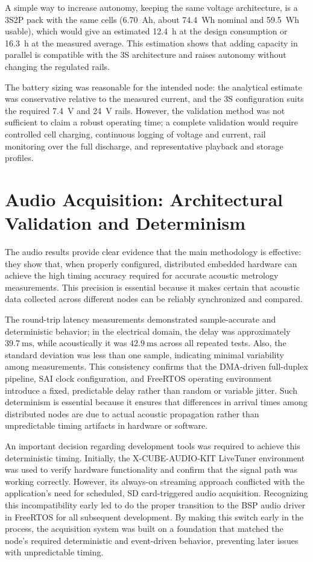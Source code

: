 A simple way to increase autonomy, keeping the same voltage architecture, is a 3S2P pack with the same cells (6.70~Ah, about 74.4~Wh nominal and 59.5~Wh usable), which would give an estimated 12.4~h at the design consumption or 16.3~h at the measured average. This estimation shows that adding capacity in parallel is compatible with the 3S architecture and raises autonomy without changing the regulated rails.

The battery sizing was reasonable for the intended node: the analytical estimate was conservative relative to the measured current, and the 3S configuration suits the required 7.4~V and 24~V rails. However, the validation method was not sufficient to claim a robust operating time; a complete validation would require controlled cell charging, continuous logging of voltage and current, rail monitoring over the full discharge, and representative playback and storage profiles.

\section{Audio Acquisition: Architectural Validation and Determinism}

The audio results provide clear evidence that the main methodology is effective: they show that, when properly configured, distributed embedded hardware can achieve the high timing accuracy required for accurate acoustic metrology measurements. This precision is essential because it makes certain that acoustic data collected across different nodes can be reliably synchronized and compared.

The round-trip latency measurements demonstrated sample-accurate and deterministic behavior; in the electrical domain, the delay was approximately $\SI{39.7}{\ms}$, while acoustically it was $\SI{42.9}{\ms}$ across all repeated tests. Also, the standard deviation was less than one sample, indicating minimal variability among measurements. This consistency confirms that the DMA-driven full-duplex pipeline, SAI clock configuration, and FreeRTOS operating environment introduce a fixed, predictable delay rather than random or variable jitter. Such determinism is essential because it ensures that differences in arrival times among distributed nodes are due to actual acoustic propagation rather than unpredictable timing artifacts in hardware or software.

An important decision regarding development tools was required to achieve this deterministic timing. Initially, the X-CUBE-AUDIO-KIT LiveTuner environment was used to verify hardware functionality and confirm that the signal path was working correctly. However, its always-on streaming approach conflicted with the application’s need for scheduled, SD card-triggered audio acquisition. Recognizing this incompatibility early led to do the proper transition to the BSP audio driver in FreeRTOS for all subsequent development. By making this switch early in the process, the acquisition system was built on a foundation that matched the node’s required deterministic and event-driven behavior, preventing later issues with unpredictable timing.

